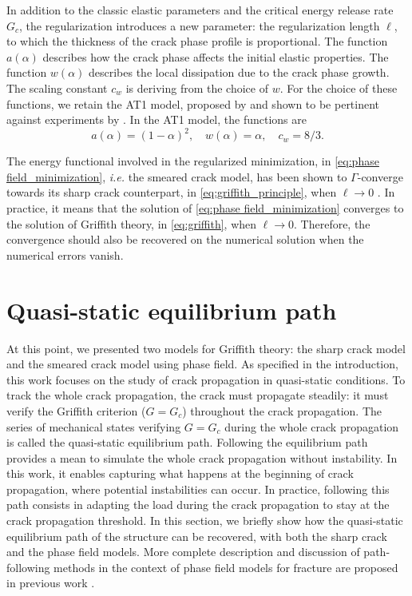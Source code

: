 \documentclass[OptSoft]{jtcam_preprint}
\begin{document}
In addition to the classic elastic parameters and the critical energy release rate $G_c$, the regularization introduces a new parameter: the regularization length $\ell$, to which the thickness of the crack phase profile is proportional.
The function $a(\alpha)$ describes how the crack phase affects the initial elastic properties.
The function $w(\alpha)$ describes the local dissipation due to the crack phase growth.
The scaling constant $c_w$ is deriving from the choice of $w$.
For the choice of these functions, we retain the AT1 model, proposed by \textcite{pham_gradient_2011} and shown to be pertinent against experiments by \textcite{tanne_crack_2018}.
In the AT1 model, the functions are
\begin{equation}
  a(\alpha) = (1 - \alpha)^2
  , \quad
  w(\alpha) = \alpha
  , \quad
  c_w = 8/3.
\end{equation}

The energy functional  involved in the regularized minimization, in \cref{eq:phase field_minimization}, \emph{i.e.} the smeared crack model, has been shown to $\Gamma$-converge towards its sharp crack counterpart, in \cref{eq:griffith_principle}, when $\ell \rightarrow 0$ \parencite{braides_approximation_1998}.
In practice, it means that the solution of \cref{eq:phase field_minimization} converges to the solution of Griffith theory, in \cref{eq:griffith}, when $\ell \to 0$.
Therefore, the convergence should also be recovered on the numerical solution when the numerical errors vanish.

\section{Quasi-static equilibrium path}
\label{sec:path-following}

At this point, we presented two models for Griffith theory: the sharp crack model and the smeared crack model using phase field.
As specified in the introduction, this work focuses on the study of crack propagation in quasi-static conditions.
To track the whole crack propagation, the crack must propagate steadily: it must verify the Griffith criterion ($G=G_c$) throughout the crack propagation.
The series of mechanical states verifying $G=G_c$ during the whole crack propagation is called the quasi-static equilibrium path.
Following the equilibrium path provides a mean to simulate the whole crack propagation without instability.
In this work, it enables capturing what happens at the beginning of crack propagation, where potential instabilities can occur.
In practice, following this path consists in adapting the load during the crack propagation to stay at the crack propagation threshold.
In this section, we briefly show how the quasi-static equilibrium path of the structure can be recovered, with both the sharp crack and the phase field models.
More complete description and discussion of path-following methods in the context of phase field models for fracture are proposed in previous work \parencite{loiseau_path-following_2025}.
\end{document}
